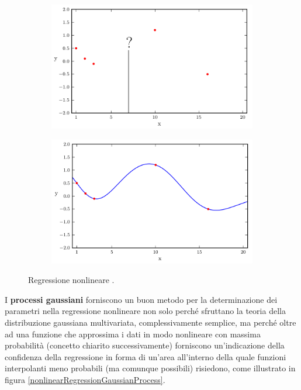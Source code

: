 \begin{oss}
\begin{figure}[h]
\centering
\begin{subfigure}{.5\textwidth}
  \centering
  \includegraphics[width=\linewidth]{images/Gaussian process/motivazione2.png}
\end{subfigure}%
\begin{subfigure}{.5\textwidth}
  \centering
  \includegraphics[width=\linewidth]{images/Gaussian process/motivazione3.png}
\end{subfigure}
\caption{Regressione nonlineare \cite{turner_gaussian_2016}.}
\end{figure}


\newpage

I \textbf{processi gaussiani} forniscono un buon metodo per la determinazione dei parametri nella regressione nonlineare non solo perché sfruttano la teoria della distribuzione gaussiana multivariata, complessivamente semplice, ma perché oltre ad una funzione che  approssima i dati in modo nonlineare con massima probabilità (concetto chiarito successivamente) forniscono un'indicazione della confidenza della regressione in forma di un'area all'interno della quale funzioni interpolanti meno probabili (ma comunque possibili) risiedono, come illustrato in figura \ref{nonlinearRegressionGaussianProcess}.



\end{oss}
